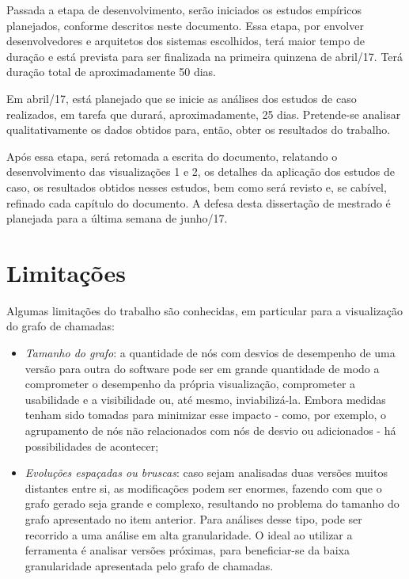 Passada a etapa de desenvolvimento, serão iniciados os estudos empíricos planejados, conforme descritos neste documento. Essa etapa, por envolver desenvolvedores e arquitetos dos sistemas escolhidos, terá maior tempo de duração e está prevista para ser finalizada na primeira quinzena de abril/17. Terá duração total de aproximadamente 50 dias.

Em abril/17, está planejado que se inicie as análises dos estudos de caso realizados, em tarefa que durará, aproximadamente, 25 dias. Pretende-se analisar qualitativamente os dados obtidos para, então, obter os resultados do trabalho.

Após essa etapa, será retomada a escrita do documento, relatando o desenvolvimento das visualizações 1 e 2, os detalhes da aplicação dos estudos de caso, os resultados obtidos nesses estudos, bem como será revisto e, se cabível, refinado cada capítulo do documento. A defesa desta dissertação de mestrado é planejada para a última semana de junho/17.

\section{Limitações} \label{sec:limitacoes}

Algumas limitações do trabalho são conhecidas, em particular para a visualização do grafo de chamadas:
\begin{itemize}
	\item \textit{Tamanho do grafo}: a quantidade de nós com desvios de desempenho de uma versão para outra do software pode ser em grande quantidade de modo a comprometer o desempenho da própria visualização, comprometer a usabilidade e a visibilidade ou, até mesmo, inviabilizá-la. Embora medidas tenham sido tomadas para minimizar esse impacto - como, por exemplo, o agrupamento de nós não relacionados com nós de desvio ou adicionados - há possibilidades de acontecer;
	\item \textit{Evoluções espaçadas ou bruscas}: caso sejam analisadas duas versões muitos distantes entre si, as modificações podem ser enormes, fazendo com que o grafo gerado seja grande e complexo, resultando no problema do tamanho do grafo apresentado no item anterior. Para análises desse tipo, pode ser recorrido a uma análise em alta granularidade. O ideal ao utilizar a ferramenta é analisar versões próximas, para beneficiar-se da baixa granularidade apresentada pelo grafo de chamadas.
\end{itemize}

